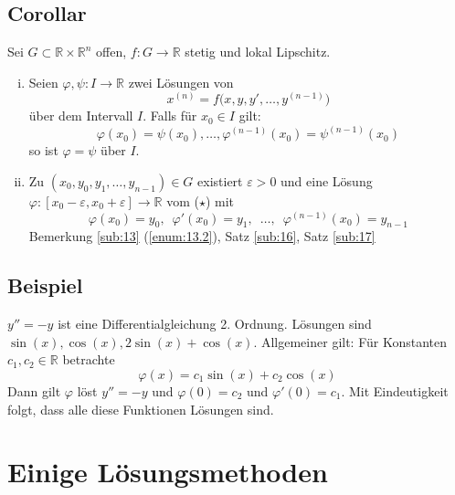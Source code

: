 \subsection[Corollar: Folgerungen aus dem Eindeutigkeits- und  Existenzsatz]{Corollar} %
\label{sub:19}
Sei $G \subset \mathds{R} \times \mathds{R}^n$ offen, $f : G \to \mathds{R}$ stetig und lokal Lipschitz.
\begin{enumerate}[(i)]
	\item Seien $\varphi, \psi : I \to \mathds{R}$ zwei Lösungen von 
	\[
		x^{(n)}= f\big(x, y, y', \ldots , y^{(n-1)}\big) \tag{$\star$}
	\]
	über dem Intervall $I$. Falls für $x_0 \in I$ gilt:
	\[
		\varphi(x_0)= \psi(x_0), \ldots , \varphi^{(n-1)}(x_0) = \psi^{(n-1)}(x_0)
	\]
	so ist $\varphi=\psi$ über $I$.
	\item Zu $(x_0, y_0, y_1, \ldots , y_{n-1}) \in G$ existiert $\varepsilon>0$ und eine Lösung $\varphi : [x_0 -\varepsilon, x_0 +\varepsilon] \to \mathds{R}$ vom 
	($\star$) mit 
	\[
		\varphi(x_0) = y_0, \enspace\varphi'(x_0)=y_1, \enspace\ldots , \enspace \varphi^{(n-1)}(x_0) = y_{n-1} 
	\]
	Bemerkung \ref{sub:13} (\ref{enum:13.2}), Satz \ref{sub:16}, Satz \ref{sub:17} \bewende
\end{enumerate}

\subsection[Beispiel: Winkelfunktionen als Lösungen]{Beispiel} %
\label{sub:110}
$y''=-y$ ist eine Differentialgleichung 2. Ordnung. Lösungen sind $\sin(x), \cos(x), 2 \sin(x)+ \cos(x)$. Allgemeiner gilt: Für Konstanten $c_1, c_2 \in \mathds{R}$ betrachte 
\[
	\varphi(x) = c_1 \sin(x)+ c_2 \cos(x)
\]
Dann gilt $\varphi$ löst $y''=-y$ und $\varphi(0)=c_2$ und $\varphi'(0)=c_1$. Mit Eindeutigkeit folgt, dass alle diese Funktionen Lösungen sind.
\newpage
\section{Einige Lösungsmethoden} %
\label{sec:2}
